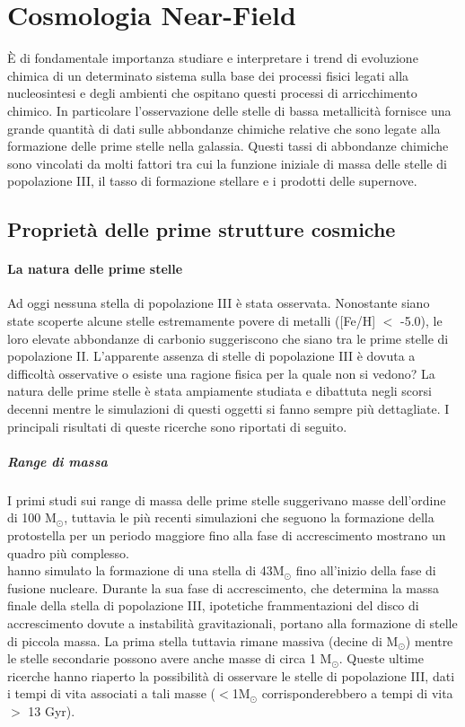 \documentclass[12pt]{article}
\begin{document}
\newpage

\section{Cosmologia Near-Field}

È di fondamentale importanza studiare e interpretare i trend di evoluzione chimica di un determinato sistema sulla base dei processi fisici legati alla nucleosintesi e degli ambienti che ospitano questi processi di arricchimento chimico. In particolare l’osservazione delle stelle di bassa metallicità fornisce una grande quantità di dati sulle abbondanze chimiche relative che sono legate alla formazione delle prime stelle nella galassia. Questi tassi di abbondanze chimiche sono vincolati da molti fattori tra cui la funzione iniziale di massa delle stelle di popolazione III, il tasso di formazione stellare e i prodotti delle supernove.


\subsection{Proprietà delle prime strutture cosmiche}

\paragraph{La natura delle prime stelle} 

Ad oggi nessuna stella di popolazione III è stata osservata. Nonostante siano state scoperte alcune stelle estremamente povere di metalli ([Fe/H] $<$ -5.0), le loro elevate abbondanze di carbonio suggeriscono che siano tra le prime stelle di popolazione II.
L’apparente assenza di stelle di popolazione III è dovuta a difficoltà osservative o esiste una ragione fisica per la quale non si vedono? La natura delle prime stelle è stata ampiamente studiata e dibattuta negli scorsi decenni mentre le simulazioni di questi oggetti si fanno sempre più dettagliate. I principali risultati di queste ricerche sono riportati di seguito.
\subparagraph{Range di massa}

I primi studi sui range di massa delle prime stelle suggerivano masse dell’ordine di 100 M$_{\odot}$, tuttavia le più recenti simulazioni che seguono la formazione della protostella per un periodo maggiore fino alla fase di accrescimento mostrano un quadro più complesso.\\
\cite{hosokawa} hanno simulato la formazione di una stella di 43M$_{\odot}$ fino all’inizio della fase di fusione nucleare. Durante la sua fase di accrescimento, che determina la massa finale della stella di popolazione III, ipotetiche frammentazioni del disco di accrescimento dovute a instabilità gravitazionali, portano alla formazione di stelle di piccola massa. La prima stella tuttavia rimane massiva (decine di M$_{\odot}$) mentre le stelle secondarie possono avere anche masse di circa 1 M$_{\odot}$.  Queste ultime ricerche hanno riaperto la possibilità di osservare le stelle di popolazione III, dati i tempi di vita associati a tali masse ($<$1M$_{\odot}$ corrisponderebbero a tempi di vita $>$ 13 Gyr).\\
\end{document}
